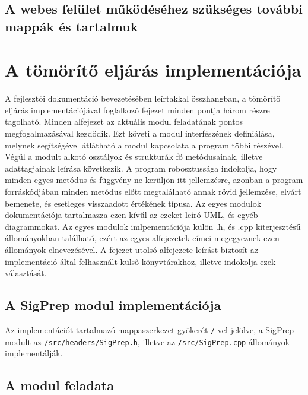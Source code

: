 \documentclass[oneside,titlepage,12pt,a4paper]{report}
\begin{document}
\subsection{A webes felület működéséhez szükséges további mappák és tartalmuk}

\section{A tömörítő eljárás implementációja}

A fejlesztői dokumentáció bevezetésében leírtakkal összhangban, a tömörítő eljárás implementációjával foglalkozó fejezet minden pontja három részre tagolható. Minden alfejezet az aktuális modul feladatának pontos megfogalmazásával kezdődik. Ezt követi a modul interfészének definiálása, melynek segítségével átlátható a modul kapcsolata a program többi részével. Végül a modult alkotó osztályok és strukturák fő metódusainak, illetve adattagjainak leírása következik. A program robosztussága indokolja, hogy minden egyes metódus és függvény ne kerüljön itt jellemzésre, azonban a program forráskódjában minden metódus előtt megtalálható annak rövid jellemzése, elvárt bemenete, és esetleges visszaadott értékének típusa. Az egyes modulok dokumentációja tartalmazza ezen kívűl az ezeket leíró UML, és egyéb diagrammokat. Az egyes modulok imlpementációja külön .h, és .cpp kiterjesztésű állományokban található, ezért az egyes alfejezetek címei megegyeznek ezen állományok elnevezésével. A fejezet utolsó alfejezete leírást biztosít az implementáció által felhasznált külső könyvtárakhoz, illetve indokolja ezek választását.

\subsection{A SigPrep modul implementációja}

Az implementációt tartalmazó mappaszerkezet gyökerét \texttt{/}-vel jelölve, a SigPrep modult  az \texttt{/src/headers/SigPrep.h}, illetve az \texttt{/src/SigPrep.cpp} állományok implementálják. 

\subsection*{A modul feladata}
\end{document}
